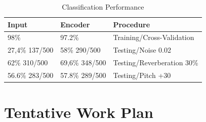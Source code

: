 \documentclass[11pt,a4paper]{article}
\begin{document}
\begin{table}[]
\centering
\caption{Classification Performance}
\label{classification_performances}
\begin{tabular}{|l|l|l|}
\hline
Input          & Encoder        & Procedure                  \\ \hline
98\%           & 97.2\%         & Training/Cross-Validation  \\ \hline
27,4\% 137/500 & 58\% 290/500   & Testing/Noise 0.02         \\ \hline
62\% 310/500   & 69,6\% 348/500 & Testing/Reverberation 30\% \\ \hline
56.6\% 283/500 & 57.8\% 289/500 & Testing/Pitch +30          \\ \hline
\end{tabular}
\end{table}

\section{Tentative Work Plan}



\printglossaries



\end{document}
